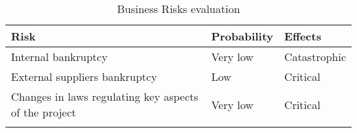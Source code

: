 \begin{longtable}{ |l|l|l| }
	\hline
	\textbf{Risk} & \textbf{Probability} & \textbf{Effects}\\
	\hline
	Internal bankruptcy
	&
	Very low
	&
	Catastrophic \\
  \hline
	External suppliers bankruptcy
	&
	Low
	&
	Critical \\
  \hline
	Changes in laws regulating key aspects of the project
	&
	Very low
	&
	Critical \\
  \hline
	\caption{Business Risks evaluation}
\end{longtable}
